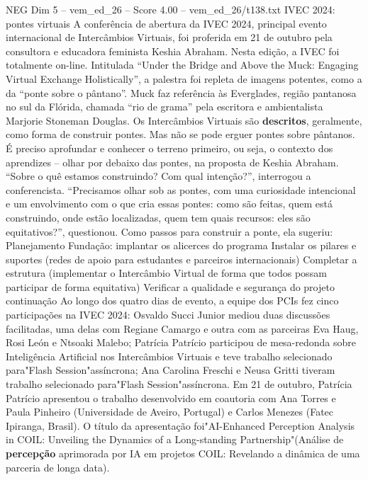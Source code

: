 \begin{textsample}{NEG Dim 5 – vem\_ed\_26 – Score 4.00 – vem\_ed\_26/t138.txt}  \label{ex:f5_neg_097}
IVEC 2024: pontes virtuais A conferência de abertura da IVEC 2024, principal evento internacional de Intercâmbios Virtuais, foi proferida em 21 de outubro pela consultora e educadora feminista Keshia Abraham.
Nesta edição, a IVEC foi totalmente on-line.
Intitulada “Under the Bridge and Above the Muck: Engaging Virtual Exchange Holistically”, a palestra foi repleta de imagens potentes, como a da “ponte sobre o pântano”.
Muck faz referência às Everglades, região pantanosa no sul da Flórida, chamada “rio de grama” pela escritora e ambientalista Marjorie Stoneman Douglas.
Os Intercâmbios Virtuais são \textbf{descritos}, geralmente, como forma de construir pontes.
Mas não se pode erguer pontes sobre pântanos.
É preciso aprofundar e conhecer o terreno primeiro, ou seja, o contexto dos aprendizes – olhar por debaixo das pontes, na proposta de Keshia Abraham. “Sobre o quê estamos construindo?
Com qual intenção?”, interrogou a conferencista. “Precisamos olhar sob as pontes, com uma curiosidade intencional e um envolvimento com o que cria essas pontes: como são feitas, quem está construindo, onde estão localizadas, quem tem quais recursos: eles são equitativos?”, questionou.
Como passos para construir a ponte, ela sugeriu: Planejamento Fundação: implantar os alicerces do programa Instalar os pilares e suportes (redes de apoio para estudantes e parceiros internacionais) Completar a estrutura (implementar o Intercâmbio Virtual de forma que todos possam participar de forma equitativa) Verificar a qualidade e segurança do projeto continuação Ao longo dos quatro dias de evento, a equipe dos PCIs fez cinco participações na IVEC 2024: Osvaldo Succi Junior mediou duas discussões facilitadas, uma delas com Regiane Camargo e outra com as parceiras Eva Haug, Rosi León e Ntsoaki Malebo; Patrícia Patrício participou de mesa-redonda sobre Inteligência Artificial nos Intercâmbios Virtuais e teve trabalho selecionado para"Flash Session"assíncrona; Ana Carolina Freschi e Neusa Gritti tiveram trabalho selecionado para"Flash Session"assíncrona.
Em 21 de outubro, Patrícia Patrício apresentou o trabalho desenvolvido em coautoria com Ana Torres e Paula Pinheiro (Universidade de Aveiro, Portugal) e Carlos Menezes (Fatec Ipiranga, Brasil).
O título da apresentação foi"AI-Enhanced Perception Analysis in COIL: Unveiling the Dynamics of a Long-standing Partnership"(Análise de \textbf{percepção} aprimorada por IA em projetos COIL: Revelando a dinâmica de uma parceria de longa data).

\end{textsample}
